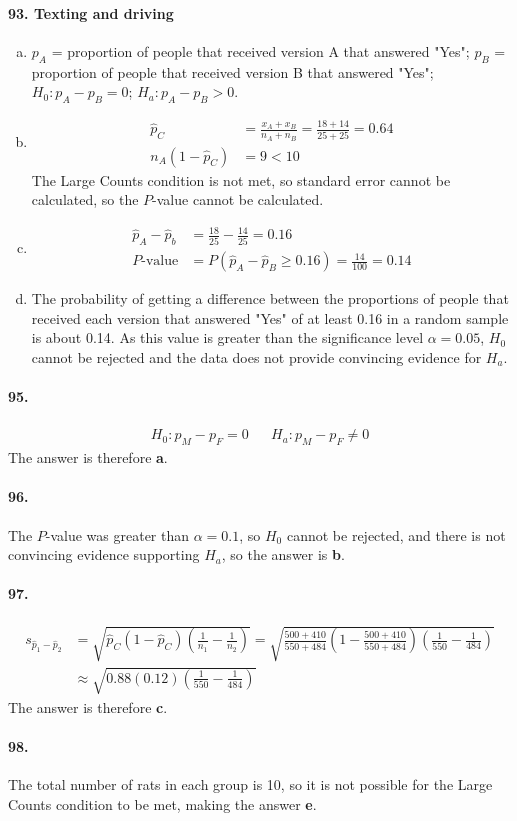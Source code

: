 \documentclass[12pt, A4]{article}
\newcommand{\propsee}[3]{\sqrt{#1\left(1 - #1\right)\left(\frac{1}{#2} - \frac{1}{#3}\right)}}
\newcommand{\propseet}[4]{\sqrt{#1\left(#2\right)\left(\frac{1}{#3} - \frac{1}{#4}\right)}}
\begin{document}
			\paragraph{93. Texting and driving}
				\begin{enumerate}[a.]
					\item
						$p_A$ = proportion of people that received version A that answered "Yes"; $p_B$ = proportion of people that received version B that answered "Yes"; $H_0: p_A - p_B = 0$; $H_a: p_A - p_B > 0$.
					\item
						\begin{align*}
							\hat{p}_C &= \frac{x_A + x_B}{n_A + n_B} = \frac{18 + 14}{25 + 25} = 0.64 \\
							n_A(1 - \hat{p}_C) &= 9 < 10
						\end{align*}
						The Large Counts condition is not met, so standard error cannot be calculated, so the $P$-value cannot be calculated.
					\item
						\begin{align*}
							\hat{p}_A - \hat{p}_b &= \frac{18}{25} - \frac{14}{25} = 0.16 \\
							P\text{-value} &= P(\hat{p}_A - \hat{p}_B \ge 0.16) = \frac{14}{100} = 0.14
						\end{align*}
					\item
						The probability of getting a difference between the proportions of people that received each version that answered "Yes" of at least 0.16 in a random sample is about 0.14. As this value is greater than the significance level $\alpha = 0.05$, $H_0$ cannot be rejected and the data does not provide convincing evidence for $H_a$.
				\end{enumerate}
			\paragraph{95.}
				\begin{align*}
					H_0:p_M - p_F = 0 && H_a: p_M - p_F \ne 0
				\end{align*}
				The answer is therefore \textbf{a}.
			\paragraph{96.}
				The $P$-value was greater than $\alpha = 0.1$, so $H_0$ cannot be rejected, and there is not convincing evidence supporting $H_a$, so the answer is \textbf{b}.
			\paragraph{97.}
				\begin{align*}
					s_{\hat{p}_1 - \hat{p}_2} &= \propsee{\hat{p}_C}{n_1}{n_2} = \propsee{\frac{500 + 410}{550 + 484}}{550}{484} \\
					&\approx \propseet{0.88}{0.12}{550}{484}
				\end{align*}
				The answer is therefore \textbf{c}.
			\paragraph{98.}
				The total number of rats in each group is 10, so it is not possible for the Large Counts condition to be met, making the answer \textbf{e}.
\end{document}
